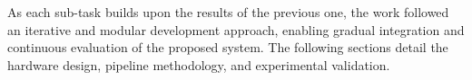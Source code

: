As each sub-task builds upon the results of the previous one, the work followed an iterative and modular development approach, enabling gradual integration and continuous evaluation of the proposed system.  
The following sections detail the hardware design, pipeline methodology, and experimental validation.  

\begin{comment}
    Here we start the System Hardware section
    System Hardware
    - Sensors (radar, IMU, webcam).
    - Mechanical integration (3D printed mounts, placement, calibration).
    - Chirp configuration & radar setup.
    * Keep at a descriptive/theoretical level (role of each hardware element in methodology). 

\end{comment}

